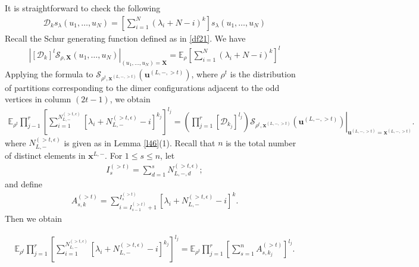 \documentclass[11pt]{amsart}
\theoremstyle{plain}
\theoremstyle{definition}
\theoremstyle{remark}
\numberwithin{equation}{section}
\numberwithin{theorem}{section}
\numberwithin{figure}{section}
\begin{document}
It is straightforward to check the following
\begin{align*}
\mathcal{D}_k s_{\lambda}(u_1,\ldots,u_N)=\left[\sum_{i=1}^N(\lambda_i+N-i)^k\right]s_{\lambda}(u_1,\ldots,u_N)
\end{align*}
Recall the Schur generating function defined as in \ref{df21}. We have
\begin{align*}
\left|[\mathcal{D}_k]^l\mathcal{S}_{\rho,\mathbf{X}}(u_1,\ldots,u_N)\right|_{(u_1,\dots,u_N)=\mathbf{X}}
=\mathbb{E}_{\rho}\left[\sum_{i=1}^N (\lambda_i+N-i)^k\right]^{l}
\end{align*}
Applying the formula to $\mathcal{S}_{\rho^t,\mathbf{x}^{(L,-,> t)}}(\mathbf{u}^{(L,-,> t)})$, where $\rho^t$ is the distribution of partitions corresponding to the dimer configurations adjacent to the odd vertices in column $(2t-1)$, we obtain
\begin{align}
\mathbb{E}_{\rho^t}\prod_{j-1}^{r}\left[\sum_{i=1}^{N^{(>t,\epsilon)}_{L,-}}\left[\lambda_i+N_{L,-}^{(>t,\epsilon)}-i\right]^{k_j}\right]^{l_j}=
\left.\left(\prod_{j=1}^{r}[\mathcal{D}_{k_j}]^{l_j}\right)\mathcal{S}_{\rho^t,\mathbf{x}^{(L,-,> t)}}(\mathbf{u}^{(L,-,> t)})\right|_{\mathbf{u}^{(L,-,> t)}=\mathbf{x}^{(L,-,> t)}}.\label{ee1}
\end{align}
where $N^{(>t,\epsilon)}_{L,-}$ is given as in Lemma \ref{l46}(1). Recall that $n$ is the total number of distinct elements in $\mathbf{x}^{L,-}$. For $1\leq s\leq n$, let
\begin{align*}
I_s^{(>t)}=\sum_{d=1}^{s}N_{L,-,d}^{(>t,\epsilon)};
\end{align*}
and define
\begin{align*}
A_{s,k}^{(>t)}=\sum_{i=I_{s-1}^{(>t)}+1}^{I_s^{(>t)}}\left[\lambda_i+N_{L,-}^{(>t,\epsilon)}-i\right]^k.
\end{align*}
Then we obtain
\begin{small}
\begin{align}
\mathbb{E}_{\rho^t}\prod_{j=1}^{r}\left[\sum_{i=1}^{N^{(>t,\epsilon)}_{L,-}}\left[\lambda_i+N_{L,-}^{(>t,\epsilon)}-i\right]^{k_j}\right]^{l_j}=
\mathbb{E}_{\rho^t}\prod_{j=1}^{r}\left[\sum_{s=1}^{n}A_{s,k_j}^{(>t)}\right]^{l_j}.\label{ee2}
\end{align}
\end{small}
\end{document}
